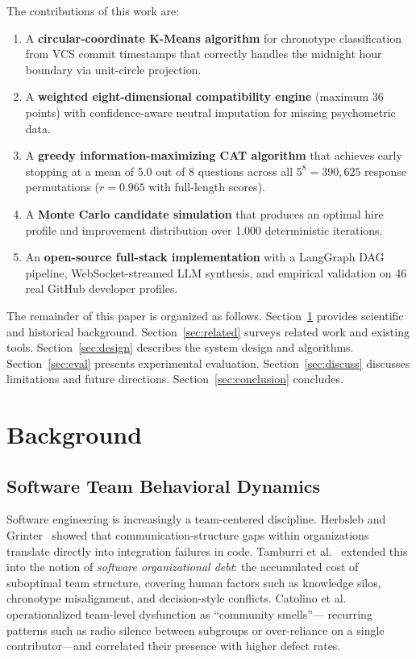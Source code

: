 \documentclass[conference]{IEEEtran}
\begin{document}
\medskip
\noindent The contributions of this work are:
\begin{enumerate}
  \item A \textbf{circular-coordinate K-Means algorithm} for
    chronotype classification from VCS commit timestamps that
    correctly handles the midnight hour boundary via unit-circle
    projection.
  \item A \textbf{weighted eight-dimensional compatibility engine}
    (maximum 36 points) with confidence-aware neutral imputation
    for missing psychometric data.
  \item A \textbf{greedy information-maximizing CAT algorithm} that
    achieves early stopping at a mean of 5.0 out of 8 questions
    across all $5^8 = 390{,}625$ response permutations
    ($r = 0.965$ with full-length scores).
  \item A \textbf{Monte Carlo candidate simulation} that produces
    an optimal hire profile and improvement distribution over
    1,000 deterministic iterations.
  \item An \textbf{open-source full-stack implementation} with a
    LangGraph DAG pipeline, WebSocket-streamed LLM synthesis, and
    empirical validation on 46 real GitHub developer profiles.
\end{enumerate}

\medskip
The remainder of this paper is organized as follows.
Section~\ref{sec:background} provides scientific and historical
background.  Section~\ref{sec:related} surveys related work and
existing tools.  Section~\ref{sec:design} describes the system
design and algorithms.  Section~\ref{sec:eval} presents
experimental evaluation.  Section~\ref{sec:discuss} discusses
limitations and future directions.  Section~\ref{sec:conclusion}
concludes.

\section{Background}
\label{sec:background}

\subsection{Software Team Behavioral Dynamics}

Software engineering is increasingly a team-centered discipline.
Herbsleb and Grinter~\cite{herbsleb1999} showed that
communication-structure gaps within organizations translate directly
into integration failures in code.  Tamburri et al.~\cite{tamburri2019}
extended this into the notion of \textit{software organizational
debt}: the accumulated cost of suboptimal team structure, covering
human factors such as knowledge silos, chronotype misalignment, and
decision-style conflicts.  Catolino et al.~\cite{catolino2019}
operationalized team-level dysfunction as ``community smells''---
recurring patterns such as radio silence between subgroups or
over-reliance on a single contributor---and correlated their
presence with higher defect rates.
\end{document}

